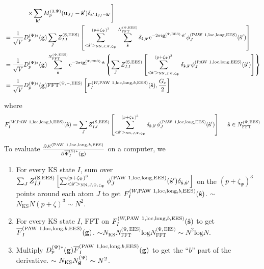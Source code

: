 \documentclass[paper=a4, fontsize=11pt]{article} %
\numberwithin{equation}{section} %
\numberwithin{figure}{section} %
\numberwithin{table}{section} %
\newcommand{\p}{\partial}
\newcommand{\ol}{\overline}
\newcommand{\bu}{{\bf{u}}}
\newcommand{\bl}{{\bf{l}}}
\newcommand{\bk}{{\bf{k}}}
\newcommand{\bs}{{\bf{s}}}
\newcommand{\bg}{{\bf{g}}}
\newcommand{\hs}{{\hat{\bf{s}}}}
\newcommand{\rS}{{\mathrm{S}}}
\newcommand{\rEES}{{\mathrm{EES}}}
\newcommand{\rNN}{{\mathrm{NN}}}
\newcommand{\re}{{\mathrm{e}}}
\newcommand{\rlong}{{\mathrm{long}}}
\newcommand{\rP}{{\mathrm{PAW}}}
\newcommand{\rlo}{{\mathrm{loc}}}
\newcommand{\rl}{{\mathrm{log}}}
\newcommand{\gcpEES}{{\bg_c^{(\Psi,\rEES)}}}
\newcommand{\psigsc}{{\overline \Psi_I^{(\rS)*}(\bg)}}
\newcommand{\NKS}{{N_{\mathrm{KS}}}}
\newcommand{\NFFTpEES}{{N^{\mathrm{(\Psi,\rEES})}_{\mathrm{FFT}}}}
\newcommand{\Ngp}{{N^{\mathrm{(\Psi})}_\bg}}
\newcommand{\hGc}{{\frac{G_{\mathrm{c}}}{2}}}
\newcommand{\Dpgc}{{D^{(\Psi)*}_p(\bg)}}
\newcommand{\Mp}{{M_p^{(3,\Psi)}}}
\newcommand{\FFTpiEES}{{\mathrm{FFT}^{(\Psi,-,\rEES)}}}
\newcommand{\pz}{{(p+\zeta)^3}}
\newcommand{\pzp}{{(p+\zeta_{\Psi})^3}}
\newcommand{\hspJp}{{<\hs'>_{\rNN,J,\Psi,\zeta_\Psi}}}
\newcommand{\hsinpEES}{{\ \ \ \ \hs \in \NFFTpEES}}
\begin{document}
\begin{equation}
\begin{split}
&\ \ \ \ \ \ \ \ \ \ \ \left. \times \sum_{\bk'} \Mp(\bu_{Jf}-\hat \bs') \delta_{\hat \bs',\bl_{Jf}-\bk'} \right] \\
&= \frac{1}{\sqrt{V}} \Dpgc \sum_J Z_{IJ}^{(\rS,\rEES)} \left[\sum_{\hspJp}^\pzp \sum_{\hs}^\NFFTpEES \delta_{\hs,\hs'} \re^{-2\pi i\gcpEES \cdot \hat\bs'} \phi_J^{(\rP\ 1,\rlo,\rlong,\rEES)}(\hs') \right]\\
&= \frac{1}{\sqrt{V}} \Dpgc \sum_{\hs}^\NFFTpEES \re^{-2\pi i\gcpEES \cdot \hat\bs}  \left\{\sum_J Z_{IJ}^{(\rS,\rEES)} \left[\sum_{\hspJp}^\pzp  \delta_{\hs,\hs'} \phi_J^{(\rP\ 1,\rlo,\rlong,\rEES)}(\hs') \right]\right\}\\
&= \frac{1}{\sqrt{V}} \Dpgc \FFTpiEES \left[F_I^{(W,\rP\ 1,\rlo,\rlong,b,\rEES)}(\hs), \hGc\right]\\
\end{split}
\end{equation}

where 
\begin{equation}
\begin{split}
F_I^{(W,\rP\ 1,\rlo,\rlong,b,\rEES)}(\hs)
&= \sum_J Z_{IJ}^{(\rS,\rEES)} \left[\sum_{\hspJp}^\pzp  \delta_{\hs,\hs'} \phi_J^{(\rP\ 1,\rlo,\rlong,\rEES)}(\hs') \right]\hsinpEES\\
\end{split}
\end{equation}


To evaluate $\frac{\p E^{(\rP\ 1,\rlo,\rlong,b,\rEES)}}{ \p \psigsc}$ on a computer, we
\begin{enumerate}
\item For every KS state $I$, sum over $\sum_J Z_{IJ}^{(\rS,\rEES)}\left[\sum_{\hspJp}^\pzp \phi_J^{(\rP\ 1,\rlo,\rlong,\rEES)}(\hs') \delta_{\hs,\hs'}\right]$ on the $\pzp$ points around each atom $J$ to get $F_I^{(W,\rP\ 1,\rlo,\rlong,b,\rEES)}(\hs)$. $\sim$ $\NKS N \pz \sim N^2$.
\item For every KS state $I$, FFT on $F_I^{(W,\rP\ 1,\rlo,\rlong,b,\rEES)}(\hs)$ to get $\ol F_I^{(\rP\ 1,\rlo,\rlong,b,\rEES)}(\bg)$. $\sim \NKS \NFFTpEES \rl \NFFTpEES \sim N^2 \rl N$.
\item Multiply $\Dpgc \ol F_I^{(\rP\ 1,\rlo,\rlong,b,\rEES)}(\bg)$ to get the ``$b$'' part of the derivative. $\sim$ $\NKS \Ngp \sim N^2$.
\end{enumerate}
\end{document}
